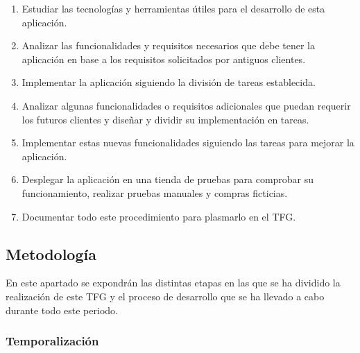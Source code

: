 \documentclass[12pt]{article}
\begin{document}
\begin{enumerate}
    \item Estudiar las tecnologías y herramientas útiles para el desarrollo de esta aplicación. \label{item:objetivo1}
    \item Analizar las funcionalidades y requisitos necesarios que debe tener la aplicación en base a los requisitos solicitados por antiguos clientes. \label{item:objetivo2}
    \item Implementar la aplicación siguiendo la división de tareas establecida. \label{item:objetivo4}
    \item Analizar algunas funcionalidades o requisitos adicionales que puedan requerir los futuros clientes y diseñar y dividir su implementación en tareas. \label{item:objetivo5}
    \item Implementar estas nuevas funcionalidades siguiendo las tareas para mejorar la aplicación. \label{item:objetivo6}
    \item Desplegar la aplicación en una tienda de pruebas para comprobar su funcionamiento, realizar pruebas manuales y compras ficticias. \label{item:objetivo7}
    \item Documentar todo este procedimiento para plasmarlo en el TFG. \label{item:objetivo8}
\end{enumerate}

\subsection{Metodología}
En este apartado se expondrán las distintas etapas en las que se ha dividido la realización de este TFG y el proceso de desarrollo que se ha 
llevado a cabo durante todo este periodo.

\subsubsection{Temporalización}
\end{document}
